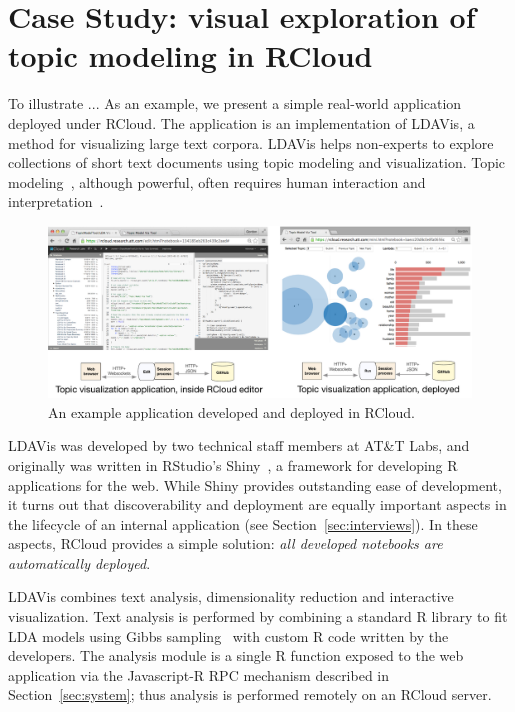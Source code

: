 \section{Case Study\label{sec:casestudy}: visual exploration of topic modeling in RCloud}

To illustrate ...
As an example, we present a simple real-world application
deployed under RCloud.
The application is an implementation of LDAVis,
a method for visualizing large text corpora.
LDAVis helps non-experts to explore collections of
short text documents using topic modeling and
visualization. Topic modeling~\cite{Blei:2003:LDA}, although
powerful, often requires human interaction
and interpretation~\cite{Sievert:2014:LAM}.

\begin{figure}
  \includegraphics[width=\linewidth]{fig/casestudytext/casestudytext.pdf}
  \caption{\label{fig:textvis}An example application developed and deployed in RCloud.}
\end{figure}

LDAVis was developed by two technical staff members at
AT\&T Labs, and originally was written in RStudio's
Shiny~\cite{RStudio:2013:SWA}, a framework for developing R
applications for the web.  While Shiny provides outstanding ease of
development, it turns out that discoverability and deployment are equally
important aspects in the lifecycle of an internal application (see
Section~\ref{sec:interviews}). In these aspects, RCloud provides a
simple solution: \emph{all developed notebooks are automatically deployed}.

LDAVis combines text analysis, dimensionality reduction and
interactive visualization. Text analysis is performed by
combining a standard R library to fit LDA models using
Gibbs sampling~\cite{} with custom R code written by the
developers. The analysis module is a single R function
exposed to the web application via the Javascript-R RPC
mechanism described in Section~\ref{sec:system};
thus analysis is performed remotely on an RCloud server.

